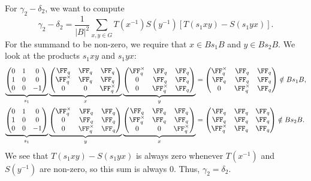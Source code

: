 \documentclass[11pt]{amsart}
\theoremstyle{remark}
\begin{document}
For $\gamma_2-\delta_2$, we want to compute
\[
	\gamma_2-\delta_2 = \frac{1}{|B|^2}\sum_{x,y\in G} T(x^{-1})S(y^{-1})[T(s_1xy)-S(s_1yx)].
\]
For the summand to be non-zero, we require that $x\in Bs_1B$ and $y\in Bs_2B$.
We look at the products $s_1xy$ and $s_1yx$:
\begin{align*}
	\underbrace{\begin{pmatrix}
			0 & 1 & 0  \\
			1 & 0 & 0  \\
			0 & 0 & -1
		\end{pmatrix}}_{s_1}
	\underbrace{\begin{pmatrix}
			\FF_q        & \FF_q & \FF_q        \\
			\FF_q^\times & \FF_q & \FF_q        \\
			0            & 0     & \FF_q^\times
		\end{pmatrix}}_{x}
	\underbrace{\begin{pmatrix}
			\FF_q^\times & \FF_q        & \FF_q \\
			0            & \FF_q        & \FF_q \\
			0            & \FF_q^\times & \FF_q
		\end{pmatrix}}_{y} & =
	\begin{pmatrix}
		\FF_q^\times & \FF_q        & \FF_q \\
		\FF_q        & \FF_q        & \FF_q \\
		0            & \FF_q^\times & \FF_q
	\end{pmatrix} \notin Bs_1B,        \\
	\underbrace{\begin{pmatrix}
			0 & 1 & 0  \\
			1 & 0 & 0  \\
			0 & 0 & -1
		\end{pmatrix}}_{s_1}
	\underbrace{\begin{pmatrix}
			\FF_q^\times & \FF_q        & \FF_q \\
			0            & \FF_q        & \FF_q \\
			0            & \FF_q^\times & \FF_q
		\end{pmatrix}}_{y}
	\underbrace{\begin{pmatrix}
			\FF_q        & \FF_q & \FF_q        \\
			\FF_q^\times & \FF_q & \FF_q        \\
			0            & 0     & \FF_q^\times
		\end{pmatrix}}_{x} & =
	\begin{pmatrix}
		\FF_q        & \FF_q & \FF_q \\
		\FF_q        & \FF_q & \FF_q \\
		\FF_q^\times & \FF_q & \FF_q
	\end{pmatrix} \notin Bs_2B.
\end{align*}
We see that $T(s_1xy)-S(s_1yx)$ is always zero whenever $T(x^{-1})$ and $S(y^{-1})$ are non-zero, so this sum is always $0$.
Thus, $\gamma_2=\delta_2$.
\end{document}
